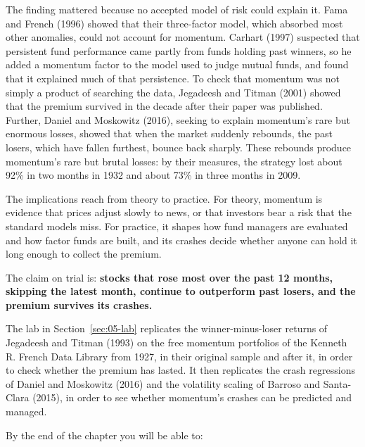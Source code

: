 The finding mattered because no accepted model of risk could explain it. Fama and French (1996) showed that their three-factor model, which absorbed most other anomalies, could not account for momentum. Carhart (1997) suspected that persistent fund performance came partly from funds holding past winners, so he added a momentum factor to the model used to judge mutual funds, and found that it explained much of that persistence. To check that momentum was not simply a product of searching the data, Jegadeesh and Titman (2001) showed that the premium survived in the decade after their paper was published. Further,
Daniel and Moskowitz (2016), seeking to explain momentum's rare but enormous losses, showed that when the market suddenly rebounds, the past losers, which have fallen furthest, bounce back sharply. These rebounds produce momentum's rare but brutal losses: by their measures, the strategy lost about 92\% in two months in 1932 and about 73\% in three months in 2009.

The implications reach from theory to practice. For theory, momentum is evidence that prices adjust slowly to news, or that investors bear a risk that the standard models miss. For practice, it shapes how fund managers are evaluated and how factor funds are built, and its crashes decide whether anyone can hold it long enough to collect the premium. 

The claim on trial is: \textbf{stocks that rose most over the past 12 months, skipping the latest month, continue to outperform past losers, and the premium survives its crashes.}

The lab in Section~\ref{sec:05-lab} replicates the winner-minus-loser returns of Jegadeesh and Titman (1993) on the free momentum portfolios of the Kenneth R. French Data Library from 1927, in their original sample and after it, in order to check whether the premium has lasted. It then replicates the crash regressions of Daniel and Moskowitz (2016) and the volatility scaling of Barroso and Santa-Clara (2015), in order to see whether momentum's crashes can be predicted and managed.

By the end of the chapter you will be able to:

